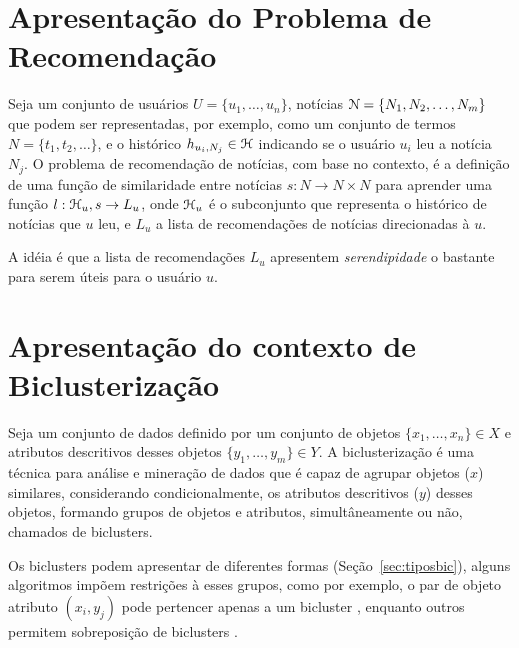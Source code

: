 \documentclass[normaltoc, espacoumemeio, pnumromarab,ruledheader]{abnt}
\begin{document}

\section{Apresentação do Problema de Recomendação}

Seja um conjunto de usuários $U = \{ u_1, \dots, u_n \}$, notícias ${\cal N} = \{ N_1, N_2, \dots, N_m \}$ que podem ser representadas, por exemplo, como um conjunto de termos $N = \{ t_1, t_2, \dots \}$, e o histórico $h_{u_i,N_j} \in {\cal H}$ indicando se o usuário $u_i$ leu a notícia $N_j$.
O problema de recomendação de notícias, com base no contexto, é a definição de uma função de similaridade entre notícias $s: N \rightarrow N \times N$ para aprender uma função $l: {\cal H}_u, s \rightarrow L_u$, onde ${\cal H}_u$ é o subconjunto que representa o histórico de notícias que $u$ leu, e $L_u$ a lista de recomendações de notícias direcionadas à $u$.

A idéia é que a lista de recomendações $L_u$ apresentem \textit{serendipidade} o bastante para serem úteis para o usuário $u$.

\section{Apresentação do contexto de Biclusterização}


Seja um conjunto de dados definido por um conjunto de objetos $\{ x_1, \dots, x_n \} \in X$ e atributos descritivos desses objetos $\{ y_1, \dots, y_m \} \in Y$.
A biclusterização é uma técnica para análise e mineração de dados que é capaz de agrupar objetos ($x$) similares, considerando condicionalmente, os atributos descritivos ($y$) desses objetos, formando grupos de objetos e atributos, simultâneamente ou não, chamados de biclusters.

Os biclusters podem apresentar de diferentes formas (Seção~\ref{sec:tiposbic}), alguns algoritmos impõem restrições à esses grupos, como por exemplo, o par de objeto atributo $(x_i,y_j)$ pode pertencer apenas a um bicluster \cite{Kluger2003}, enquanto outros permitem sobreposição de biclusters \cite{Cheng2000}.
\end{document}
